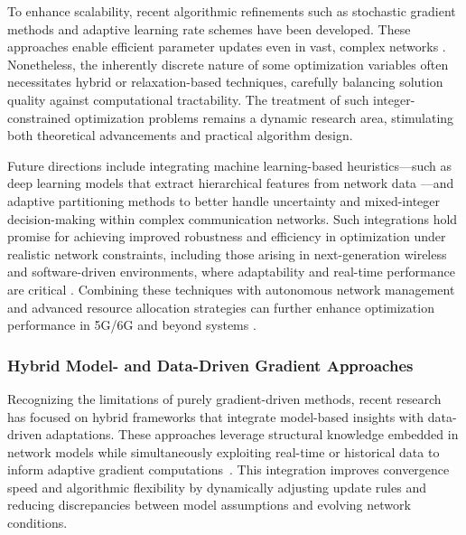 \documentclass[sigconf]{acmart}
\begin{document}
To enhance scalability, recent algorithmic refinements such as stochastic gradient methods and adaptive learning rate schemes have been developed. These approaches enable efficient parameter updates even in vast, complex networks \cite{ref1,ref9,ref10,ref11,ref12,ref14,ref16}. Nonetheless, the inherently discrete nature of some optimization variables often necessitates hybrid or relaxation-based techniques, carefully balancing solution quality against computational tractability. The treatment of such integer-constrained optimization problems remains a dynamic research area, stimulating both theoretical advancements and practical algorithm design.

Future directions include integrating machine learning-based heuristics—such as deep learning models that extract hierarchical features from network data \cite{ref16}—and adaptive partitioning methods \cite{ref36} to better handle uncertainty and mixed-integer decision-making within complex communication networks. Such integrations hold promise for achieving improved robustness and efficiency in optimization under realistic network constraints, including those arising in next-generation wireless and software-driven environments, where adaptability and real-time performance are critical \cite{ref11,ref10}. Combining these techniques with autonomous network management and advanced resource allocation strategies can further enhance optimization performance in 5G/6G and beyond systems \cite{ref12,ref14}.

\subsubsection{Hybrid Model- and Data-Driven Gradient Approaches}

Recognizing the limitations of purely gradient-driven methods, recent research has focused on hybrid frameworks that integrate model-based insights with data-driven adaptations. These approaches leverage structural knowledge embedded in network models while simultaneously exploiting real-time or historical data to inform adaptive gradient computations~\cite{ref5,ref7,ref13}. This integration improves convergence speed and algorithmic flexibility by dynamically adjusting update rules and reducing discrepancies between model assumptions and evolving network conditions.
\end{document}
